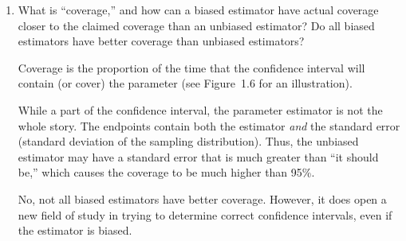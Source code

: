 \begin{enumerate}
  \item What is ``coverage,'' and how can a biased estimator have actual coverage closer to the claimed coverage than an unbiased estimator? Do all biased estimators have better coverage than unbiased estimators?
\begin{solution}
Coverage is the proportion of the time that the confidence interval will contain (or cover) the parameter (see Figure~1.6 for an illustration).

While a part of the confidence interval, the parameter estimator is not the whole story. The endpoints contain both the estimator \emph{and} the standard error (standard deviation of the sampling distribution). Thus, the unbiased estimator may have a standard error that is much greater than ``it should be,'' which causes the coverage to be much higher than 95\%.

No, not all biased estimators have better coverage. However, it does open a new field of study in trying to determine correct confidence intervals, even if the estimator is biased.
\end{solution}
%


\end{enumerate}








